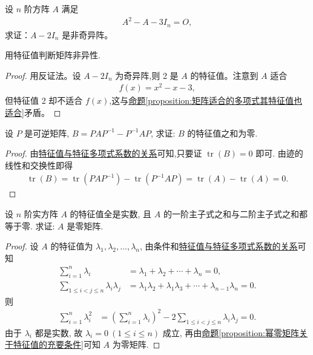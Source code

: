 \documentclass[../../main.tex]{subfiles}
\begin{document}
\begin{example}
设 \(n\) 阶方阵 \(A\) 满足 
\begin{align*}
A^2 - A - 3I_n = O,
\end{align*}
求证：\(A - 2I_n\) 是非奇异阵。
\end{example}
\begin{note}
用特征值判断矩阵非异性.
\end{note}
\begin{proof}
用反证法。设 \(A - 2I_n\) 为奇异阵,则 2 是 \(A\) 的特征值。注意到 \(A\) 适合 
\begin{align*}
f(x) = x^2 - x - 3,
\end{align*}
但特征值 2 却不适合 \(f(x)\),这与\hyperref[proposition:矩阵适合的多项式其特征值也适合]{命题\ref{proposition:矩阵适合的多项式其特征值也适合}}矛盾。
\end{proof}

\begin{example}
设 $P$ 是可逆矩阵, $B = PAP^{-1} - P^{-1}AP$, 求证: $B$ 的特征值之和为零.
\end{example}
\begin{proof}
由\hyperref[proposition:特征值与特征多项式系数的关系]{特征值与特征多项式系数的关系}可知,只要证 $\operatorname{tr}(B) = 0$ 即可. 由迹的线性和交换性即得
\begin{align*}
\operatorname{tr}(B) = \operatorname{tr}(PAP^{-1}) - \operatorname{tr}(P^{-1}AP) 
= \operatorname{tr}(A) - \operatorname{tr}(A) = 0.
\end{align*}
\end{proof}

\begin{example}
设 $n$ 阶实方阵 $A$ 的特征值全是实数, 且 $A$ 的一阶主子式之和与二阶主子式之和都等于零. 求证: $A$ 是零矩阵.
\end{example}
\begin{proof}
设 $A$ 的特征值为 $\lambda_1, \lambda_2, \dots, \lambda_n$, 由条件和\hyperref[proposition:特征值与特征多项式系数的关系]{特征值与特征多项式系数的关系}可知
\begin{align*}
\sum_{i=1}^n \lambda_i &= \lambda_1 + \lambda_2 + \cdots + \lambda_n = 0, \\
\sum_{1 \leqslant  i < j \leqslant  n} \lambda_i \lambda_j &= \lambda_1 \lambda_2 + \lambda_1 \lambda_3 + \cdots + \lambda_{n-1} \lambda_n = 0.
\end{align*}
则
\begin{align*}
\sum_{i=1}^n \lambda_i^2 &= \left( \sum_{i=1}^n \lambda_i \right)^2 - 2 \sum_{1 \leqslant  i < j \leqslant  n} \lambda_i \lambda_j = 0.
\end{align*}
由于 $\lambda_i$ 都是实数, 故 $\lambda_i = 0 \ (1 \leqslant  i \leqslant  n)$ 成立, 再由\hyperref[proposition:幂零矩阵关于特征值的充要条件]{命题\ref{proposition:幂零矩阵关于特征值的充要条件}}可知 $A$ 为零矩阵.
\end{proof}
\end{document}
